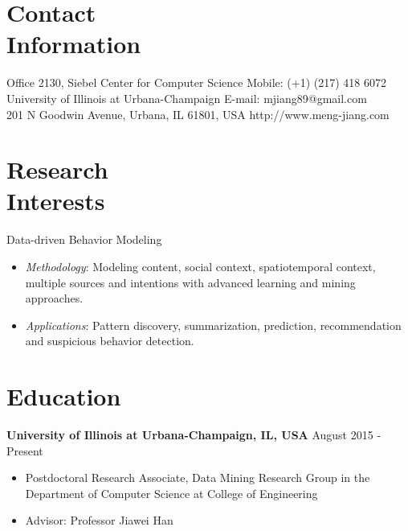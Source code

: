 \documentclass[margin, 10pt]{res} %
\begin{document}
\begin{resume}


\section{Contact \\ Information}

{Office 2130, Siebel Center for Computer Science} \hfill {Mobile:} {(+1) (217) 418 6072} \\
{University of Illinois at Urbana-Champaign} \hfill {E-mail:} {mjiang89@gmail.com} \\
{201 N Goodwin Avenue, Urbana, IL 61801, USA} \hfill {http://www.meng-jiang.com}


\section{Research \\ Interests}

Data-driven Behavior Modeling
\begin{itemize}
	\item {\em Methodology}: Modeling content, social context, spatiotemporal context,
		multiple sources and intentions with advanced learning and mining approaches.
	\item {\em Applications}: Pattern discovery, summarization, prediction,
		recommendation and suspicious behavior detection.
\end{itemize}


\section{Education}

{\bf University of Illinois at Urbana-Champaign, IL, USA} \hfill {August 2015 - Present}
\begin{itemize} \itemsep -2pt %
	\item Postdoctoral Research Associate, Data Mining Research Group in the Department of Computer Science at College of Engineering
	\item Advisor: Professor Jiawei Han
\end{itemize}


\end{resume}
\end{document}
